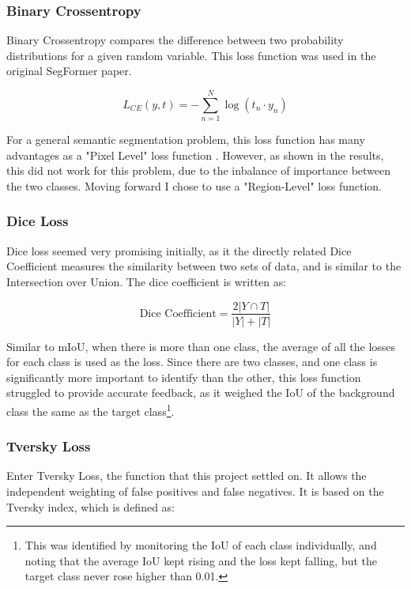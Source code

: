 \documentclass[12pt]{article}
\begin{document}
    \subsubsection*{Binary Crossentropy}

    Binary Crossentropy compares the difference between two probability distributions for a given random variable. This loss function was used in the original SegFormer paper.

    \[
        L_{CE}(y,t) = -\sum_{n=1}^{N}\log(t_n \cdot y_n)
    \]

    For a general semantic segmentation problem, this loss function has many advantages as a "Pixel Level" loss function \cite{azad2023lossfunctionserasemantic}. However, as shown in the results, this did not work for this problem, due to the inbalance of importance between the two classes. Moving forward I chose to use a "Region-Level" loss function.

    \subsubsection*{Dice Loss}

    Dice loss seemed very promising initially, as it the directly related Dice Coefficient measures the similarity between two sets of data, and is similar to the Intersection over Union. The dice coefficient is written as:

    \[
        \text{Dice Coefficient} = \frac{2 | Y \cap T | }{|Y| + |T|}
    \]

    Similar to mIoU, when there is more than one class, the average of all the losses for each class is used as the loss. Since there are two classes, and one class is significantly more important to identify than the other, this loss function struggled to provide accurate feedback, as it weighed the IoU of the background class the same as the target class\footnote{This was identified by monitoring the IoU of each class individually, and noting that the average IoU kept rising and the loss kept falling, but the target class never rose higher than 0.01.}.

    \subsubsection*{Tversky Loss}

    Enter Tversky Loss, the function that this project settled on. It allows the independent weighting of false positives and false negatives. It is based on the Tversky index, which is defined as\cite{azad2023lossfunctionserasemantic}:
\end{document}
